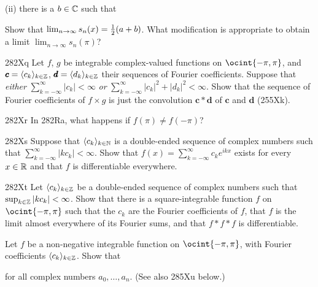 {(ii) there is a $b\in\Bbb C$ such that



\noindent Show that $\lim_{n\to\infty}s_n(x)={1\over 2}(a+b)$.
What modification is appropriate to obtain a limit
$\lim_{n\to\infty}s_n(\pi)$?

\sqheader 282Xq Let $f$, $g$ be integrable complex-valued
functions on $\ocint{-\pi,\pi}$, and
$\pmb{c}=\langle c_k\rangle_{k\in\Bbb Z}$,
$\pmb{d}=\langle d_k\rangle_{k\in\Bbb Z}$
their sequences of Fourier coefficients.   Suppose that {\it either}
$\sum_{k=-\infty}^{\infty}|c_k|<\infty$ {\it or}
$\sum_{k=-\infty}^{\infty}|c_k|^2+|d_k|^2<\infty$.   Show that the
sequence of
Fourier coefficients of $f\times g$ is just the convolution
$\pmb{c}*\pmb{d}$ of $\pmb{c}$ and $\pmb{d}$ (255Xk).

\spheader 282Xr In 282Ra, what happens if $f(\pi)\ne f(-\pi)$?

\spheader 282Xs  Suppose that $\langle c_k\rangle_{k\in\Bbb N}$
is a double-ended sequence of complex numbers such that
$\sum_{k=-\infty}^{\infty}|kc_k|<\infty$.   Show that
$f(x)=\sum_{k=-\infty}^{\infty}c_ke^{ikx}$ exists for every
$x\in\Bbb R$ and that $f$ is differentiable everywhere.

\spheader 282Xt Let $\langle c_k\rangle_{k\in\Bbb Z}$ be a
double-ended sequence of complex numbers such that
$\sup_{k\in\Bbb Z}|kc_k|<\infty$.   Show that there is a
square-integrable function $f$
on $\ocint{-\pi,\pi}$ such that the $c_k$ are the
Fourier coefficients of $f$, that $f$ is the limit almost everywhere of
its Fourier sums, and that $f*f*f$ is differentiable.   

Let $f$ be a non-negative integrable function on
$\ocint{-\pi,\pi}$, with Fourier coefficients
$\langle c_k\rangle_{k\in\Bbb Z}$.   Show that


\noindent for all complex numbers $a_0,\ldots,a_n$.   (See also 285Xu
below.)

}
